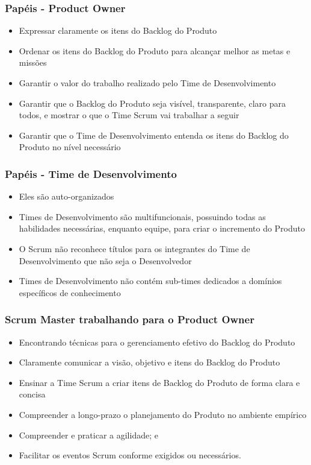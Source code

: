 \begin{frame}
 \frametitle{Papéis - Product Owner}
 \begin{itemize}
  \item Expressar claramente os itens do Backlog do Produto
  \item Ordenar os itens do Backlog do Produto para alcançar melhor as metas e missões
  \item Garantir o valor do trabalho realizado pelo Time de Desenvolvimento
  \item Garantir que o Backlog do Produto seja visível, transparente, claro para todos, e mostrar o
que o Time Scrum vai trabalhar a seguir
\item Garantir que o Time de Desenvolvimento entenda os itens do Backlog do Produto no nível
necessário
 \end{itemize}
\end{frame}

\begin{frame}
 \frametitle{Papéis - Time de Desenvolvimento}
 \begin{itemize}
  \item Eles são auto-organizados
  \item Times de Desenvolvimento são multifuncionais, possuindo todas as habilidades necessárias,
enquanto equipe, para criar o incremento do Produto
\item O Scrum não reconhece títulos para os integrantes do Time de Desenvolvimento que não
seja o Desenvolvedor
\item Times de Desenvolvimento não contém sub-times dedicados a domínios específicos de
conhecimento
 \end{itemize}
\end{frame}

\begin{frame}
 \frametitle{Scrum Master trabalhando para o Product Owner}
 \begin{itemize}
  \item Encontrando técnicas para o gerenciamento efetivo do Backlog do Produto
  \item Claramente comunicar a visão, objetivo e itens do Backlog do Produto
  \item Ensinar a Time Scrum a criar itens de Backlog do Produto de forma clara e concisa
  \item Compreender a longo-prazo o planejamento do Produto no ambiente empírico
  \item Compreender e praticar a agilidade; e
  \item Facilitar os eventos Scrum conforme exigidos ou necessários.
 \end{itemize}
\end{frame}

